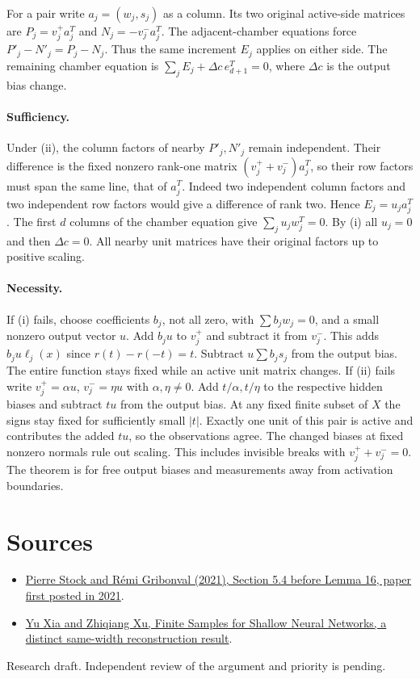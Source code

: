 \documentclass[10pt]{article}
\begin{document}
For a pair write $a_j=(w_j,s_j)$ as a column. Its two original active-side matrices are $P_j=v_j^+a_j^T$ and $N_j=-v_j^-a_j^T$. The adjacent-chamber equations force $P'_j-N'_j=P_j-N_j$. Thus the same increment $E_j$ applies on either side. The remaining chamber equation is $\sum_jE_j+\Delta c\, e_{d+1}^T=0$, where $\Delta c$ is the output bias change.

\paragraph{Sufficiency.} Under (ii), the column factors of nearby $P'_j,N'_j$ remain independent. Their difference is the fixed nonzero rank-one matrix $(v_j^++v_j^-)a_j^T$, so their row factors must span the same line, that of $a_j^T$. Indeed two independent column factors and two independent row factors would give a difference of rank two. Hence $E_j=u_j a_j^T$. The first $d$ columns of the chamber equation give $\sum_j u_j w_j^T=0$. By (i) all $u_j=0$ and then $\Delta c=0$. All nearby unit matrices have their original factors up to positive scaling.

\paragraph{Necessity.} If (i) fails, choose coefficients $b_j$, not all zero, with $\sum b_jw_j=0$, and a small nonzero output vector $u$. Add $b_ju$ to $v_j^+$ and subtract it from $v_j^-$. This adds $b_ju\ell_j(x)$ since $r(t)-r(-t)=t$. Subtract $u\sum b_js_j$ from the output bias. The entire function stays fixed while an active unit matrix changes. If (ii) fails write $v_j^+=\alpha u$, $v_j^-=\eta u$ with $\alpha,\eta\ne0$. Add $t/\alpha,t/\eta$ to the respective hidden biases and subtract $tu$ from the output bias. At any fixed finite subset of $X$ the signs stay fixed for sufficiently small $|t|$. Exactly one unit of this pair is active and contributes the added $tu$, so the observations agree. The changed biases at fixed nonzero normals rule out scaling. This includes invisible breaks with $v_j^++v_j^-=0$. The theorem is for free output biases and measurements away from activation boundaries.

\section*{Sources}
\begin{itemize}
\item \href{https://arxiv.org/abs/2107.09370}{Pierre Stock and Rémi Gribonval (2021), Section 5.4 before Lemma 16, paper first posted in 2021}.
\item \href{https://arxiv.org/abs/2503.12744}{Yu Xia and Zhiqiang Xu, Finite Samples for Shallow Neural Networks, a distinct same-width reconstruction result}.
\end{itemize}
{\small Research draft. Independent review of the argument and priority is pending.}
\end{document}
